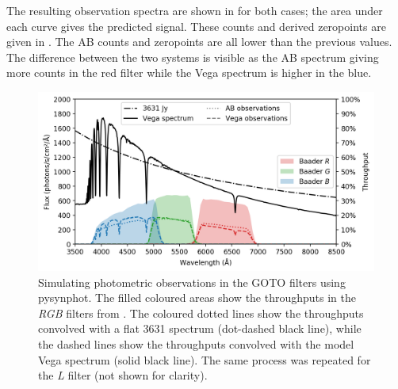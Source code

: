\begin{colsection}
\begin{colsection}
The resulting observation spectra are shown in  for both cases; the area under each curve gives the predicted signal. These counts and derived zeropoints are given in . The AB counts and zeropoints are all lower than the previous values. The difference between the two systems is visible as the AB spectrum giving more counts in the red filter while the Vega spectrum is higher in the blue.

\newpage

\begin{figure}[p]
    \begin{center}
        \includegraphics[width=\textwidth]{images/throughput/synphot.png}
    \end{center}
    \caption[Simulating photometric observations in the GOTO filters using pysynphot]{
        Simulating photometric observations in the GOTO filters using pysynphot. The filled coloured areas show the throughputs in the \textit{RGB} filters from . The coloured dotted lines show the throughputs convolved with a flat \SI{3631}{\jansky} spectrum (dot-dashed black line), while the dashed lines show the throughputs convolved with the model Vega spectrum (solid black line). The same process was repeated for the \textit{L} filter (not shown for clarity).
    }\label{fig:pysynphot}
\end{figure}


\end{colsection}
\end{colsection}
